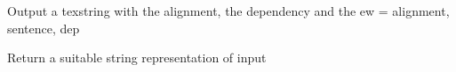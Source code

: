 \documentclass[letterpaper,10pt,english]{sphinxmanual}
\begin{document}
\begin{fulllineitems}
\begin{fulllineitems}
\label{file_processing:file_processing.ProcessDependencies.texstring}
Output a texstring with the alignment, the dependency
and the 
ew = alignment, sentence, dep

\end{fulllineitems}


\begin{fulllineitems}
\label{file_processing:file_processing.ProcessDependencies.transform_contents}
Return a suitable string representation of
input

\end{fulllineitems}


\end{fulllineitems}

\end{document}
